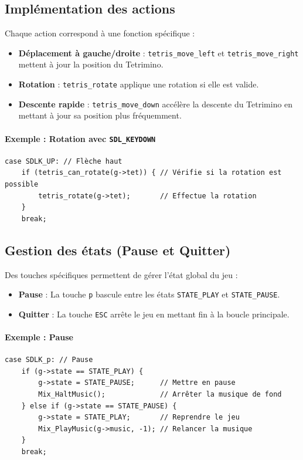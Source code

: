 \documentclass[12pt,a4paper]{report}
\begin{document}
\subsection{Implémentation des actions}
Chaque action correspond à une fonction spécifique :
\begin{itemize}
    \item \textbf{Déplacement à gauche/droite} : \texttt{tetris\_move\_left} et \texttt{tetris\_move\_right} mettent à jour la position du Tetrimino.
    \item \textbf{Rotation} : \texttt{tetris\_rotate} applique une rotation si elle est valide.
    \item \textbf{Descente rapide} : \texttt{tetris\_move\_down} accélère la descente du Tetrimino en mettant à jour sa position plus fréquemment.
\end{itemize}

\paragraph{Exemple : Rotation avec \texttt{SDL\_KEYDOWN}}
\begin{lstlisting}
case SDLK_UP: // Flèche haut
    if (tetris_can_rotate(g->tet)) { // Vérifie si la rotation est possible
        tetris_rotate(g->tet);       // Effectue la rotation
    }
    break;
\end{lstlisting}

\subsection{Gestion des états (Pause et Quitter)}
Des touches spécifiques permettent de gérer l’état global du jeu :
\begin{itemize}
    \item \textbf{Pause} : La touche \texttt{p} bascule entre les états \texttt{STATE\_PLAY} et \texttt{STATE\_PAUSE}.
    \item \textbf{Quitter} : La touche \texttt{ESC} arrête le jeu en mettant fin à la boucle principale.
\end{itemize}

\paragraph{Exemple : Pause}
\begin{lstlisting}
case SDLK_p: // Pause
    if (g->state == STATE_PLAY) {
        g->state = STATE_PAUSE;      // Mettre en pause
        Mix_HaltMusic();             // Arrêter la musique de fond
    } else if (g->state == STATE_PAUSE) {
        g->state = STATE_PLAY;       // Reprendre le jeu
        Mix_PlayMusic(g->music, -1); // Relancer la musique
    }
    break;
\end{lstlisting}
\end{document}
